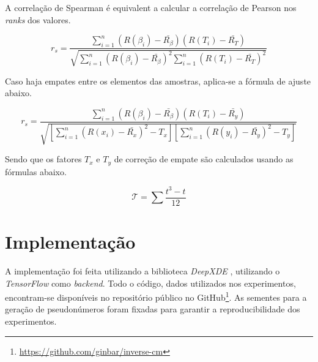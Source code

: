 A correlação de Spearman é equivalent a calcular a correlação de Pearson nos 
\textit{ranks} dos valores.

\begin{equation}
r_s = \frac{\sum_{i=1}^{n} (R(\beta_i) - \bar{R_{\beta}})(R(T_i) - \bar{R_{T}})}{\sqrt{\sum_{i=1}^{n} (R(\beta_i) - \bar{R_{\beta}})^2 \sum_{i=1}^{n} (R(T_i) - \bar{R_T})^2}}
\end{equation}

Caso haja empates entre os elementos das amostras, aplica-se a fórmula de ajuste
abaixo.

\begin{equation}
r_s = \frac{\sum_{i=1}^{n} (R(\beta_i) - \bar{R_{\beta}})(R(T_i) - \bar{R_y})}{\sqrt{\left[\sum_{i=1}^{n} (R(x_i) - \bar{R_x})^2 - T_x\right]\left[\sum_{i=1}^{n} (R(y_i) - \bar{R_y})^2 - T_y\right]}}
\end{equation}

Sendo que os fatores $T_x$ e $T_y$ de correção de empate são calculados
usando as fórmulas abaixo.  

\begin{equation}
\mathcal{T} = \sum \frac{t^3 - t}{12}
\end{equation}


\section{Implementação}

A implementação foi feita utilizando a biblioteca \textit{DeepXDE} \cite{lu-etal:21-deepxde}, 
utilizando o \textit{TensorFlow} \cite{tensorflow:16} como \textit{backend}. 
Todo o código, dados utilizados nos experimentos,
encontram-se disponíveis no repositório público no 
GitHub\footnote{\url{https://github.com/ginbar/inverse-cm}}.
As sementes para a geração de pseudonúmeros foram fixadas para garantir
a reproducibilidade dos experimentos.
